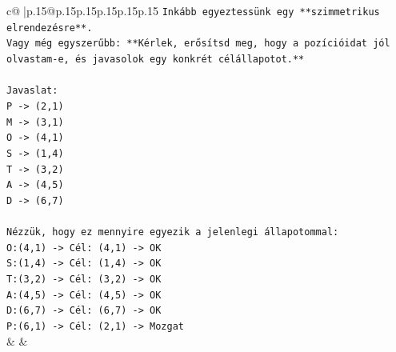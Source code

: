 \documentclass{article}
\begin{document}
{\begin{supertabular}{c@{$\;$}|p{.15\linewidth}@{}p{.15\linewidth}p{.15\linewidth}p{.15\linewidth}p{.15\linewidth}p{.15\linewidth}}
{{{\texttt{Inkább egyeztessünk egy **szimmetrikus elrendezésre**.} \\
\texttt{Vagy még egyszerűbb: **Kérlek, erősítsd meg, hogy a pozícióidat jól olvastam{-}e, és javasolok egy konkrét célállapotot.**} \\
\\ 
\texttt{Javaslat:} \\
\texttt{P {-}> (2,1)} \\
\texttt{M {-}> (3,1)} \\
\texttt{O {-}> (4,1)} \\
\texttt{S {-}> (1,4)} \\
\texttt{T {-}> (3,2)} \\
\texttt{A {-}> (4,5)} \\
\texttt{D {-}> (6,7)} \\
\\ 
\texttt{Nézzük, hogy ez mennyire egyezik a jelenlegi állapotommal:} \\
\texttt{O:(4,1) {-}> Cél: (4,1) {-}> OK} \\
\texttt{S:(1,4) {-}> Cél: (1,4) {-}> OK} \\
\texttt{T:(3,2) {-}> Cél: (3,2) {-}> OK} \\
\texttt{A:(4,5) {-}> Cél: (4,5) {-}> OK} \\
\texttt{D:(6,7) {-}> Cél: (6,7) {-}> OK} \\
\texttt{P:(6,1) {-}> Cél: (2,1) {-}> Mozgat} \\
            }
        }
    }
    & & \\ \\


\end{supertabular}}
\end{document}
